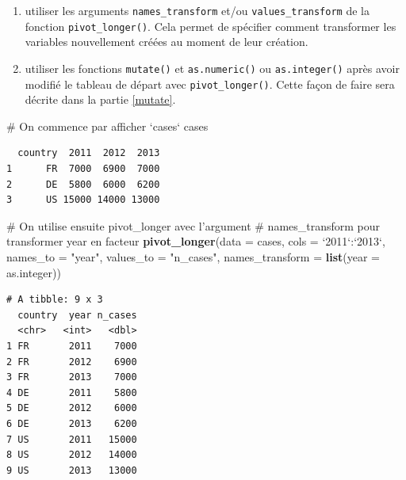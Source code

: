 \documentclass[
  a4paper,
]{article}
\newenvironment{Shaded}{\begin{snugshade}}{\end{snugshade}}
\newcommand{\CommentTok}[1]{\textcolor[rgb]{0.54,0.53,0.53}{#1}}
\newcommand{\DataTypeTok}[1]{\textcolor[rgb]{0.00,0.34,0.68}{#1}}
\newcommand{\KeywordTok}[1]{\textcolor[rgb]{0.12,0.11,0.11}{\textbf{#1}}}
\newcommand{\NormalTok}[1]{\textcolor[rgb]{0.12,0.11,0.11}{#1}}
\newcommand{\OperatorTok}[1]{\textcolor[rgb]{0.12,0.11,0.11}{#1}}
\newcommand{\StringTok}[1]{\textcolor[rgb]{0.75,0.01,0.01}{#1}}
\providecommand{\tightlist}{%
  \setlength{\itemsep}{0pt}\setlength{\parskip}{0pt}}
\begin{document}
\begin{enumerate}
\def\labelenumi{\arabic{enumi}.}
\tightlist
\item
  utiliser les arguments \texttt{names\_transform} et/ou \texttt{values\_transform} de la fonction \texttt{pivot\_longer()}. Cela permet de spécifier comment transformer les variables nouvellement créées au moment de leur création.
\item
  utiliser les fonctions \texttt{mutate()} et \texttt{as.numeric()} ou \texttt{as.integer()} après avoir modifié le tableau de départ avec \texttt{pivot\_longer()}. Cette façon de faire sera décrite dans la partie \ref{mutate}.
\end{enumerate}

\begin{Shaded}
\begin{Highlighting}[]
\CommentTok{# On commence par afficher `cases`}
\NormalTok{cases }
\end{Highlighting}
\end{Shaded}

\begin{verbatim}
  country  2011  2012  2013
1      FR  7000  6900  7000
2      DE  5800  6000  6200
3      US 15000 14000 13000
\end{verbatim}

\begin{Shaded}
\begin{Highlighting}[]
\CommentTok{# On utilise ensuite pivot_longer avec l'argument }
\CommentTok{# names_transform pour transformer year en facteur}
\KeywordTok{pivot_longer}\NormalTok{(}\DataTypeTok{data =}\NormalTok{ cases, }
             \DataTypeTok{cols =} \StringTok{`}\DataTypeTok{2011}\StringTok{`}\OperatorTok{:}\StringTok{`}\DataTypeTok{2013}\StringTok{`}\NormalTok{, }
             \DataTypeTok{names_to =} \StringTok{"year"}\NormalTok{, }
             \DataTypeTok{values_to =} \StringTok{"n_cases"}\NormalTok{,}
             \DataTypeTok{names_transform =} \KeywordTok{list}\NormalTok{(}\DataTypeTok{year =}\NormalTok{ as.integer))}
\end{Highlighting}
\end{Shaded}

\begin{verbatim}
# A tibble: 9 x 3
  country  year n_cases
  <chr>   <int>   <dbl>
1 FR       2011    7000
2 FR       2012    6900
3 FR       2013    7000
4 DE       2011    5800
5 DE       2012    6000
6 DE       2013    6200
7 US       2011   15000
8 US       2012   14000
9 US       2013   13000
\end{verbatim}
\end{document}
